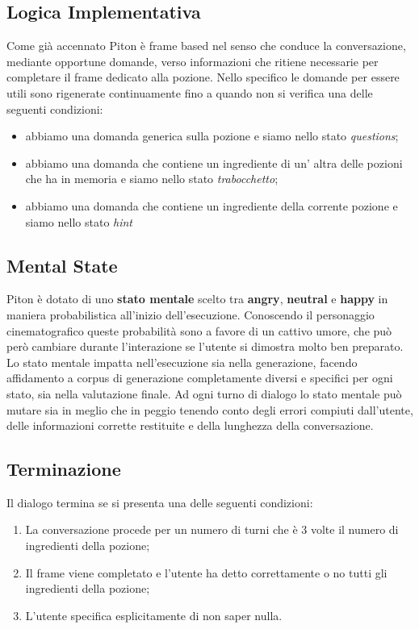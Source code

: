 \subsection{Logica Implementativa}
Come già accennato Piton è frame based nel senso che conduce la conversazione, mediante opportune domande, verso informazioni che ritiene necessarie per completare il frame dedicato alla pozione. Nello specifico le domande per essere utili sono rigenerate continuamente fino a quando non si verifica una delle seguenti condizioni:
\begin{itemize}
    \item abbiamo una domanda generica sulla pozione e siamo nello stato \textit{questions};
    \item abbiamo una domanda che contiene un ingrediente di un' altra delle pozioni che ha in memoria e siamo nello stato \textit{trabocchetto};
    \item abbiamo una domanda che contiene un ingrediente della corrente pozione e siamo nello stato \textit{hint}
\end{itemize}
\subsection{Mental State}
Piton è dotato di uno \textbf{stato mentale} scelto tra \textbf{angry}, \textbf{neutral} e \textbf{happy} in maniera probabilistica all'inizio dell'esecuzione. Conoscendo il personaggio cinematografico queste probabilità sono a favore di un cattivo umore, che può però cambiare durante l'interazione se l'utente si dimostra molto ben preparato. Lo stato mentale impatta nell'esecuzione sia nella generazione, facendo affidamento a corpus di generazione completamente diversi e specifici per ogni stato, sia nella valutazione finale. Ad ogni turno di dialogo lo stato mentale può mutare sia in meglio che in peggio tenendo conto degli errori compiuti dall'utente, delle informazioni corrette restituite e della lunghezza della conversazione. 
\subsection{Terminazione}
Il dialogo termina se si presenta una delle seguenti condizioni:
\begin{enumerate}
    \item La conversazione procede per un numero di turni che è 3 volte il numero di ingredienti della pozione;
    \item Il frame viene completato e l'utente ha detto correttamente o no tutti gli ingredienti della pozione;
    \item L'utente specifica esplicitamente di non saper nulla.
\end{enumerate}

